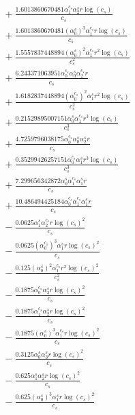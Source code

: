 \documentclass[10pt]{article}
\begin{document}
\begin{align*}
&{}  + \frac{1.6013860670481 \alpha_{1}^{c_s} \alpha_{2}^s r \log{\left(c_{s} \right)}}{c_{s}} \\
&{}  + \frac{1.6013860670481 \left(\alpha_{0}^s\right)^{3} \alpha_{1}^{c_s} r \log{\left(c_{s} \right)}}{c_{s}} \\
&{}  + \frac{1.5557837448894 \left(\alpha_{0}^s\right)^{2} \alpha_{1}^{c_s} r^{2} \log{\left(c_{s} \right)}}{c_{s}^{2}} \\
&{}  + \frac{6.243371063951 \alpha_{0}^{c_s} \alpha_{0}^s \alpha_{2}^{c_s} r}{c_{s}} \\
&{}  + \frac{1.6182837448894 \left(\alpha_{0}^{c_s}\right)^{2} \alpha_{1}^s r^{2} \log{\left(c_{s} \right)}}{c_{s}^{2}} \\
&{}  + \frac{0.21529895007151 \alpha_{0}^s \alpha_{1}^{c_s} r^{3} \log{\left(c_{s} \right)}}{c_{s}^{3}} \\
&{}  + \frac{4.7259796038175 \alpha_{0}^{c_s} \alpha_{0}^s \alpha_{2}^s r}{c_{s}} \\
&{}  + \frac{0.35299426257151 \alpha_{0}^{c_s} \alpha_{1}^s r^{3} \log{\left(c_{s} \right)}}{c_{s}^{3}} \\
&{}  + \frac{7.299656342872 \alpha_{0}^s \alpha_{1}^{c_s} \alpha_{1}^s r}{c_{s}} \\
&{}  + \frac{10.486494425184 \alpha_{0}^{c_s} \alpha_{1}^{c_s} \alpha_{1}^s r}{c_{s}} \\
&{}  - \frac{0.0625 \alpha_{1}^s \alpha_{2}^{c_s} r \log{\left(c_{s} \right)}^{2}}{c_{s}} \\
&{}  - \frac{0.0625 \left(\alpha_{0}^{c_s}\right)^{3} \alpha_{1}^s r \log{\left(c_{s} \right)}^{2}}{c_{s}} \\
&{}  - \frac{0.125 \left(\alpha_{0}^s\right)^{2} \alpha_{1}^{c_s} r^{2} \log{\left(c_{s} \right)}^{2}}{c_{s}^{2}} \\
&{}  - \frac{0.1875 \alpha_{0}^{c_s} \alpha_{3}^s r \log{\left(c_{s} \right)}^{2}}{c_{s}} \\
&{}  - \frac{0.1875 \alpha_{1}^{c_s} \alpha_{2}^s r \log{\left(c_{s} \right)}^{2}}{c_{s}} \\
&{}  - \frac{0.1875 \left(\alpha_{0}^s\right)^{3} \alpha_{1}^{c_s} r \log{\left(c_{s} \right)}^{2}}{c_{s}} \\
&{}  - \frac{0.3125 \alpha_{0}^s \alpha_{3}^s r \log{\left(c_{s} \right)}^{2}}{c_{s}} \\
&{}  - \frac{0.625 \alpha_{1}^s \alpha_{2}^s r \log{\left(c_{s} \right)}^{2}}{c_{s}} \\
&{}  - \frac{0.625 \left(\alpha_{0}^s\right)^{3} \alpha_{1}^s r \log{\left(c_{s} \right)}^{2}}{c_{s}} \\

\end{align*}
\end{document}

